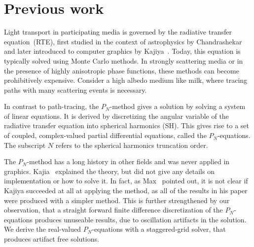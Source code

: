 \section{Previous work}

Light transport in participating media is governed by the radiative transfer equation~(RTE), first studied in the context of astrophysics by Chandrashekar~\cite{Chandrasekhar60} and later introduced to computer graphics by Kajiya~\cite{Kajiya86}. Today, this equation is typically solved using Monte Carlo methods. In strongly scattering media or in the presence of highly anisotropic phase functions, these methods can become prohibitively expensive. Consider a high albedo medium like milk, where tracing paths with many scattering events is necessary.

In contrast to path-tracing, the $P_N$-method gives a solution by solving a system of linear equations. It is derived by discretizing the angular variable of the radiative transfer equation into spherical harmonics (SH). This gives rise to a set of coupled, complex-valued partial differential equations, called the $P_N$-equations. The subscript $N$ refers to the spherical harmonics truncation order.

The $P_N$-method has a long history in other fields and was never applied in graphics. Kajia~\cite{Kajiya84} explained the theory, but did not give any details on implementation or how to solve it. In fact, as Max~\cite{Max95} pointed out, it is not clear if Kajiya succeeded at all at applying the method, as all of the results in his paper were produced with a simpler method. This is further strengthened by our observation, that a straight forward finite difference discretization of the $P_N$-equations produces unuseable results, due to oscillation artifacts in the solution. We derive the real-valued $P_N$-equations with a staggered-grid solver, that produces artifact free solutions.

